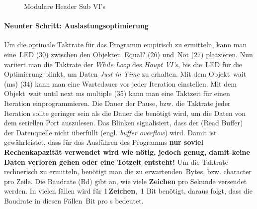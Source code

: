 \begin{figure}[h] %
\centering
\caption[Modulare Header Sub VI's]{Modulare Header Sub VI's}
\label{fig:modularer_header}
   \end{figure}

\paragraph{Neunter Schritt: Auslastungsoptimierung} Um die optimale Taktrate für das Programm empirisch zu ermitteln, kann man eine \,{\Menlo LED} (30) zwischen den Objekten \,{\Menlo Equal?} (26) und \,{\Menlo Not} (27) platzieren. Nun variiert man die Taktrate  der \textit{While Loop} des  \textit{Haupt VI's}, bis die \,{\Menlo LED} für die Optimierung blinkt, um Daten \textit{Just in Time} zu erhalten. Mit dem Objekt \,{\Menlo wait (ms)} (34) kann man eine Wartedauer vor jeder Iteration einstellen. Mit dem Objekt \,{\Menlo wait until next ms multiple} (35) kann man eine Taktzeit für einen Iteration einprogrammieren. Die Dauer der Pause, bzw. die Taktrate jeder Iteration sollte geringer sein als die Dauer die benötigt wird, um die Daten von dem seriellen Port auszulesen. Das Blinken signalisiert, dass der (Read Buffer) der Datenquelle nicht überfüllt (engl. \textit{buffer overflow}) wird. Damit ist gewährleistet, dass für das Ausführen des Programms \textbf{ nur soviel Rechenkapazität verwendet wird wie nötig, jedoch genug, damit keine Daten verloren gehen oder eine Totzeit entsteht!} Um die Taktrate rechnerisch zu ermitteln, benötigt man die zu erwartenden \,{\Menlo Bytes}, bzw. character pro Zeile. Die Baudrate (Bd) gibt an, wie viele \textbf{Zeichen} pro Sekunde versendet werden. In vielen fällen wird für 1\,\textbf{Zeichen},
\,1\,\,{\Menlo Bit} benötigt, daraus folgt, dass die Baudrate in diesen Fällen \,{\Menlo Bit} pro s bedeutet.\\


